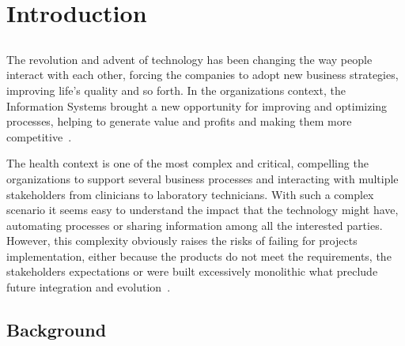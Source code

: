 \chapter{Introduction} \label{chap:intro}

\section*{}



The revolution and advent of technology has been changing the way people interact with each other, forcing the companies to adopt new business strategies, improving life's quality and so forth. In the organizations context, the Information Systems brought a new opportunity for improving and optimizing processes, helping to generate value and profits and making them more competitive~\citep{Gurbaxani1991}.

The health context is one of the most complex and critical, compelling the organizations to support several business processes and interacting with multiple stakeholders from clinicians to laboratory technicians. With such a complex scenario it seems easy to understand the impact that the technology might have, automating processes or sharing information among all the interested parties. However, this complexity obviously raises the risks of failing for projects implementation, either because the products do not meet the requirements, the stakeholders expectations or were built excessively monolithic what preclude future integration and evolution~\citep{Chu2006}.

\section{Background} \label{sec:background}

